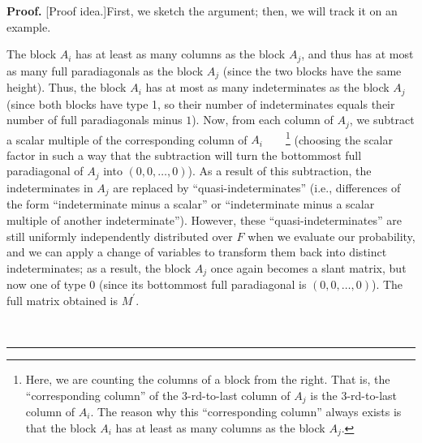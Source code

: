 \documentclass[numbers=enddot,12pt,final,onecolumn,notitlepage]{scrartcl}%
\theoremstyle{definition}
\newenvironment{proof}[1][Proof]{\noindent\textbf{#1.} }{\ \rule{0.5em}{0.5em}}
\theoremstyle{plainsl}
\begin{document}
\begin{proof}
[Proof idea.]First, we sketch the argument; then, we will track it on an example.

The block $A_{i}$ has at least as many columns as the block $A_{j}$, and thus
has at most as many full paradiagonals as the block $A_{j}$ (since the two
blocks have the same height). Thus, the block $A_{i}$ has at most as many
indeterminates as the block $A_{j}$ (since both blocks have type 1, so their
number of indeterminates equals their number of full paradiagonals minus $1$).
Now, from each column of $A_{j}$, we subtract a scalar multiple of the
corresponding column of $A_{i}$\ \ \ \ \footnote{Here, we are counting the
columns of a block from the right. That is, the ``corresponding column''
of the $3$-rd-to-last column of
$A_{j}$ is the $3$-rd-to-last column of $A_{i}$. The reason why this
``corresponding column'' always exists is
that the block $A_{i}$ has at least as many columns as the block $A_{j}$.}
(choosing the scalar factor in such a way that the subtraction will turn the
bottommost full paradiagonal of $A_{j}$ into $\left(  0,0,\ldots,0\right)  $).
As a result of this subtraction, the indeterminates in $A_{j}$ are replaced by
``quasi-indeterminates'' (i.e., differences
of the form ``indeterminate minus a scalar'' or
``indeterminate minus a scalar multiple of another
indeterminate''). However, these ``quasi-indeterminates'' are still uniformly
independently
distributed over $F$ when we evaluate our probability, and we can apply a
change of variables to transform them back into distinct indeterminates; as a
result, the block $A_{j}$ once again becomes a slant matrix, but now one of
type 0 (since its bottommost full paradiagonal is $\left(  0,0,\ldots
,0\right)  $). The full matrix obtained is $M^{\prime}$.


\end{proof}
\end{document}
